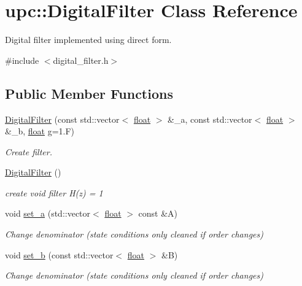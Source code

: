 \hypertarget{classupc_1_1DigitalFilter}{}\section{upc\+:\+:Digital\+Filter Class Reference}
\label{classupc_1_1DigitalFilter}


Digital filter implemented using direct form.  




{\ttfamily \#include $<$digital\+\_\+filter.\+h$>$}

\subsection*{Public Member Functions}
\begin{DoxyCompactItemize}
\item 
\hyperlink{classupc_1_1DigitalFilter_a3d8e61b92170380d06b26aee1ebc1f16}{Digital\+Filter} (const std\+::vector$<$ \hyperlink{FFTReal__readme_8txt_a0ea2fae2a8106200bf378b90eae003cf}{float} $>$ \&\+\_\+a, const std\+::vector$<$ \hyperlink{FFTReal__readme_8txt_a0ea2fae2a8106200bf378b90eae003cf}{float} $>$ \&\+\_\+b, \hyperlink{FFTReal__readme_8txt_a0ea2fae2a8106200bf378b90eae003cf}{float} g=1.\+F)
\begin{DoxyCompactList}\small\item\em Create filter. \end{DoxyCompactList}\item 
\hyperlink{classupc_1_1DigitalFilter_ac3c32e0d51a88354482f13528e9a7842}{Digital\+Filter} ()
\begin{DoxyCompactList}\small\item\em create void filter H(z) = 1 \end{DoxyCompactList}\item 
void \hyperlink{classupc_1_1DigitalFilter_ade3c3a24bbfbc1b2edbf4bcd0885a9e6}{set\+\_\+a} (std\+::vector$<$ \hyperlink{FFTReal__readme_8txt_a0ea2fae2a8106200bf378b90eae003cf}{float} $>$ const \&A)
\begin{DoxyCompactList}\small\item\em Change denominator (state conditions only cleaned if order changes) \end{DoxyCompactList}\item 
void \hyperlink{classupc_1_1DigitalFilter_a9f23a5e9db027eb0c9b70bd9b5d08e09}{set\+\_\+b} (const std\+::vector$<$ \hyperlink{FFTReal__readme_8txt_a0ea2fae2a8106200bf378b90eae003cf}{float} $>$ \&B)
\begin{DoxyCompactList}\small\item\em Change denominator (state conditions only cleaned if order changes) \end{DoxyCompactList}\item 

\end{DoxyCompactItemize}
